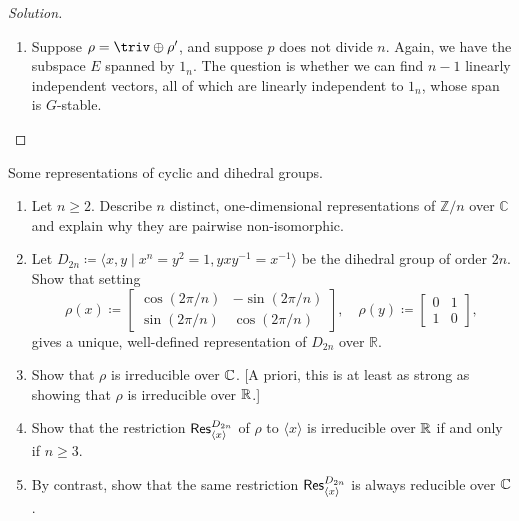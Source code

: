 \begin{proof}[Solution]
\begin{enumerate}[font=\normalfont,label=\textbf{(\alph*)}, wide]
\item Suppose $\rho = \triv \oplus \rho'$, and suppose $p$ does not divide $n$. Again, we have the subspace $E$ spanned by $1_n$. The question is whether we can find $n-1$ linearly independent vectors, all of which are linearly independent to $1_n$, whose span is $G$-stable.   

\end{enumerate}
\end{proof}

\newpage



\begin{problem}
Some representations of cyclic and dihedral groups.
\begin{enumerate}[font=\normalfont,label=\textbf{(\alph*)}]
\item Let $n \geq 2$. Describe $n$ distinct, one-dimensional representations of $\mathbb{Z}/n$ over $\mathbb{C}$ and explain why they are pairwise non-isomorphic. 

\item Let $D_{2n} \coloneqq \langle x, y \mid x^n = y^2 = 1, yxy^{-1} = x^{-1} \rangle$ be the dihedral group of order $2n$. Show that setting 
\[
\rho(x) \coloneqq
\begin{bmatrix}
\cos(2\pi/n) & -\sin(2\pi/n) \\
\sin(2\pi/n) & \cos(2\pi/n)
\end{bmatrix}
, \quad
\rho(y) \coloneqq
\begin{bmatrix}
0 & 1 \\
1 & 0
\end{bmatrix}
,
\]
gives a unique, well-defined representation of $D_{2n}$ over $\mathbb{R}$. 

\item Show that $\rho$ is irreducible over $\mathbb{C}$. [A priori, this is at least as strong as showing that $\rho$ is irreducible over $\mathbb{R}$.]

\item Show that the restriction $\mathsf{Res}^{D_{2n}}_{\langle x\rangle}$ of $\rho$ to $\langle x \rangle$ is irreducible over $\mathbb{R}$ if and only if $n\geq 3$. 

\item By contrast, show that the same restriction $\mathsf{Res}^{D_{2n}}_{\langle x\rangle}$ is always reducible over $\mathbb{C}$.
\end{enumerate}
\end{problem}

